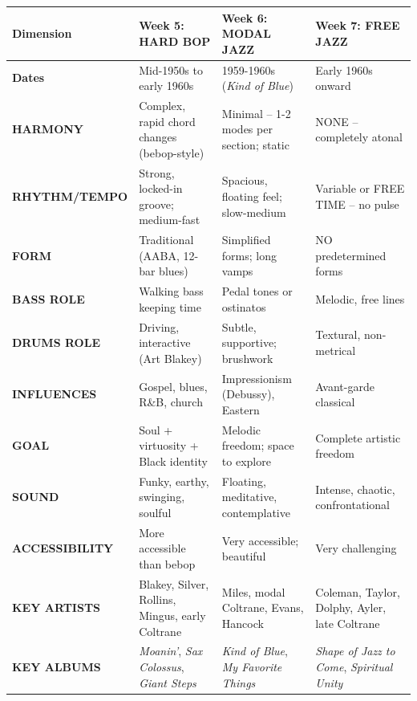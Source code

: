 \documentclass[11pt]{article}
\begin{document}
\begin{center}
\small
\begin{tabular}{|p{2.5cm}|p{3.8cm}|p{3.8cm}|p{3.8cm}|}
\hline
\rowcolor{gray!20}
\textbf{Dimension} & \textbf{\textcolor{hardbop}{Week 5: HARD BOP}} & \textbf{\textcolor{modal}{Week 6: MODAL JAZZ}} & \textbf{\textcolor{freejazz}{Week 7: FREE JAZZ}} \\
\hline
\textbf{Dates} & Mid-1950s to early 1960s & 1959-1960s (\textit{Kind of Blue}) & Early 1960s onward \\
\hline
\textbf{HARMONY} & Complex, rapid chord changes (bebop-style) & Minimal – 1-2 modes per section; static & NONE – completely atonal \\
\hline
\textbf{RHYTHM/TEMPO} & Strong, locked-in groove; medium-fast & Spacious, floating feel; slow-medium & Variable or FREE TIME – no pulse \\
\hline
\textbf{FORM} & Traditional (AABA, 12-bar blues) & Simplified forms; long vamps & NO predetermined forms \\
\hline
\textbf{BASS ROLE} & Walking bass keeping time & Pedal tones or ostinatos & Melodic, free lines \\
\hline
\textbf{DRUMS ROLE} & Driving, interactive (Art Blakey) & Subtle, supportive; brushwork & Textural, non-metrical \\
\hline
\textbf{INFLUENCES} & Gospel, blues, R\&B, church & Impressionism (Debussy), Eastern & Avant-garde classical \\
\hline
\textbf{GOAL} & Soul + virtuosity + Black identity & Melodic freedom; space to explore & Complete artistic freedom \\
\hline
\textbf{SOUND} & Funky, earthy, swinging, soulful & Floating, meditative, contemplative & Intense, chaotic, confrontational \\
\hline
\textbf{ACCESSIBILITY} & More accessible than bebop & Very accessible; beautiful & Very challenging \\
\hline
\textbf{KEY ARTISTS} & Blakey, Silver, Rollins, Mingus, early Coltrane & Miles, modal Coltrane, Evans, Hancock & Coleman, Taylor, Dolphy, Ayler, late Coltrane \\
\hline
\textbf{KEY ALBUMS} & \textit{Moanin'}, \textit{Sax Colossus}, \textit{Giant Steps} & \textit{Kind of Blue}, \textit{My Favorite Things} & \textit{Shape of Jazz to Come}, \textit{Spiritual Unity} \\
\hline
\end{tabular}
\end{center}
\end{document}
